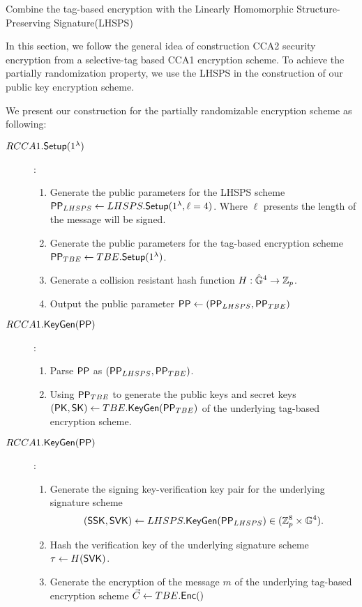 \begin{subsection}{Combine the tag-based encryption with the Linearly Homomorphic Structure-Preserving Signature(LHSPS)}

	In this section, we follow the general idea of construction CCA2 security encryption from a selective-tag based CCA1 encryption scheme.
	To achieve the partially randomization property, we use the LHSPS in the construction of our public key encryption scheme.
	
	We present our construction for the partially randomizable encryption scheme as following:
	
	\begin{description}
	\item[$\boldmath{RCCA1.{\mathsf{Setup}}(1^\lambda)}$]:
		\begin{enumerate}
		\item Generate the public parameters for the LHSPS scheme $\mathsf{PP}_{LHSPS} \gets LHSPS.{\mathsf{Setup}}(1^\lambda, \ell = 4)$. Where $\ell$ presents the length of the message will be signed.
		\item Generate the public parameters for the tag-based encryption scheme $\mathsf{PP}_{TBE} \gets TBE.{\mathsf{Setup}}(1^\lambda)$.
		\item Generate a collision resistant hash function $H : \hat{\mathbb{G}}^4 \to \mathbb{Z}_p$. 
		\item Output the public parameter $\mathsf{PP} \gets (\mathsf{PP}_{LHSPS}, \mathsf{PP}_{TBE})$
		\end{enumerate}
		
	\item[$\boldmath{RCCA1.{\mathsf{KeyGen}}(\mathsf{PP})}$]:
		\begin{enumerate}
		\item Parse $\mathsf{PP}$ as $(\mathsf{PP}_{LHSPS}, \mathsf{PP}_{TBE})$.
		\item Using $\mathsf{PP}_{TBE}$ to generate the public keys and secret keys $(\mathsf{PK}, \mathsf{SK}) \gets TBE.{\mathsf{KeyGen}}(\mathsf{PP}_{TBE})$ of the underlying tag-based encryption scheme.
		\end{enumerate}
		
	\item[$\boldmath{RCCA1.{\mathsf{KeyGen}}(\mathsf{PP})}$]:
		\begin{enumerate}
		\item Generate the signing key-verification key pair for the underlying signature scheme 
		$$(\mathsf{SSK}, \mathsf{SVK}) \gets LHSPS. {\mathsf{KeyGen}}(\mathsf{PP}_{LHSPS}) \in (\mathbb{Z}_p^8 \times \mathbb{G}^4).$$
		\item Hash the verification key of the underlying signature scheme $\tau \gets H(\mathsf{SVK})$.
		\item Generate the encryption of the message $m$ of the underlying tag-based encryption scheme $\vec{C} \gets TBE.{\mathsf{Enc}}()$
		\end{enumerate}
		
	\end{description}
\end{subsection}